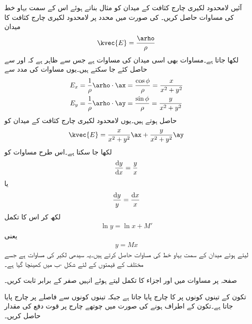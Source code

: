 آئیں لامحدود لکیری چارج کثافت کے میدان کو مثال بناتے ہوئے اس  کے سمت بہاو خط کی مساوات حاصل کریں۔ کی صورت میں  محدد پر لامحدود لکیری چارج کثافت کا میدان
\begin{align}\label{مساوات_کولومب_لکیری_میدان_دوبارہ}
\kvec{E}=\frac{\arho}{\rho}
\end{align}
لکھا جاتا ہے۔مساوات  بھی اسی میدان کی مساوات ہے جس سے ظاہر ہے کہ  اور  سے حاصل کئے جا سکتے ہیں۔یوں مساوات  کی مدد سے
\begin{align*}
E_x&=\frac{1}{\rho} \arho \cdot \ax=\frac{\cos \phi}{\rho}=\frac{x}{x^2+y^2}\\
E_y&=\frac{1}{\rho} \arho \cdot \ay=\frac{\sin \phi}{\rho}=\frac{y}{x^2+y^2}
\end{align*} 
حاصل ہوتے ہیں۔یوں لامحدود لکیری چارج کثافت کے میدان کو
\begin{align}
\kvec{E}=\frac{x}{x^2+y^2}\ax+\frac{y}{x^2+y^2}\ay
\end{align}
لکھا جا سکتا ہے۔اس طرح مساوات  کو
\begin{align*}
\frac{\dif y}{\dif x}=\frac{y}{x}
\end{align*}
یا
\begin{align*}
\frac{\dif y}{y}=\frac{\dif x}{x}
\end{align*}
لکھ کر اس کا تکمل
\begin{align*}
\ln y = \ln x +M'
\end{align*}
یعنی
\begin{align}
y=Mx
\end{align}
لیتے ہوئے میدان کے سمت بہاو خط کی مساوات حاصل کرتے ہیں۔یہ سیدھی لکیر کی مساوات ہے جسے مختلف  کے قیمتوں کے لئے شکل -ب میں کھینچا گیا ہے۔

\newpage
{}

صفحہ  پر مساوات  میں  اور  اجزاء کا تکمل لیتے ہوئے انہیں صفر کے برابر ثابت کریں۔

تکون کے تینوں کونوں پر  کا چارج پایا جاتا ہے جبکہ تینوں کونوں سے  فاصلے پر  چارج پایا جاتا ہے۔تکون کے اطراف  ہونے کی صورت میں چوتھے چارج پر قوت دفع  کی مقدار حاصل کریں۔

